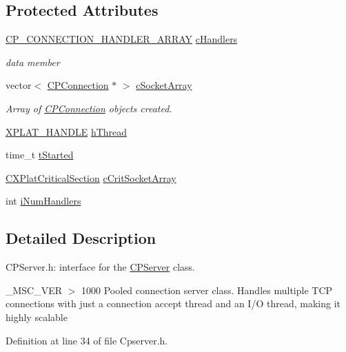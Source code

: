 \subsection*{\-Protected \-Attributes}
\begin{DoxyCompactItemize}
\item 
\hyperlink{_c_p_connection_handler_8h_a05bf2fef946dbf14350a5f45bb28f953}{\-C\-P\-\_\-\-C\-O\-N\-N\-E\-C\-T\-I\-O\-N\-\_\-\-H\-A\-N\-D\-L\-E\-R\-\_\-\-A\-R\-R\-A\-Y} \hyperlink{class_c_p_server_a1080e054402b166e08c38bdb0f92969a}{c\-Handlers}
\begin{DoxyCompactList}\small\item\em data member \end{DoxyCompactList}\item 
vector$<$ \hyperlink{class_c_p_connection}{\-C\-P\-Connection} $\ast$ $>$ \hyperlink{class_c_p_server_a5529eba58fcaf14f96b39895520b5468}{c\-Socket\-Array}
\begin{DoxyCompactList}\small\item\em \-Array of \hyperlink{class_c_p_connection}{\-C\-P\-Connection} objects created. \end{DoxyCompactList}\item 
\hyperlink{_x_plat_8h_af3c5c1485bb09f4be888d78cdaf93e00}{\-X\-P\-L\-A\-T\-\_\-\-H\-A\-N\-D\-L\-E} \hyperlink{class_c_p_server_aaff398bbe130c88c778231fb9dc163c6}{h\-Thread}
\item 
time\-\_\-t \hyperlink{class_c_p_server_a18665bfa95ace98f79d6e1b6b7a38398}{t\-Started}
\item 
\hyperlink{class_c_x_plat_critical_section}{\-C\-X\-Plat\-Critical\-Section} \hyperlink{class_c_p_server_a80980bd78734de4dc8fa48f5efdc502d}{c\-Crit\-Socket\-Array}
\item 
int \hyperlink{class_c_p_server_a1d016fb3e151466593bc3c16941bd222}{i\-Num\-Handlers}
\end{DoxyCompactItemize}


\subsection{\-Detailed \-Description}
\-C\-P\-Server.\-h\-: interface for the \hyperlink{class_c_p_server}{\-C\-P\-Server} class. 

\-\_\-\-M\-S\-C\-\_\-\-V\-E\-R $>$ 1000 \-Pooled connection server class. \-Handles multiple \-T\-C\-P connections with just a connection accept thread and an \-I/\-O thread, making it highly scalable 

\-Definition at line 34 of file \-Cpserver.\-h.



